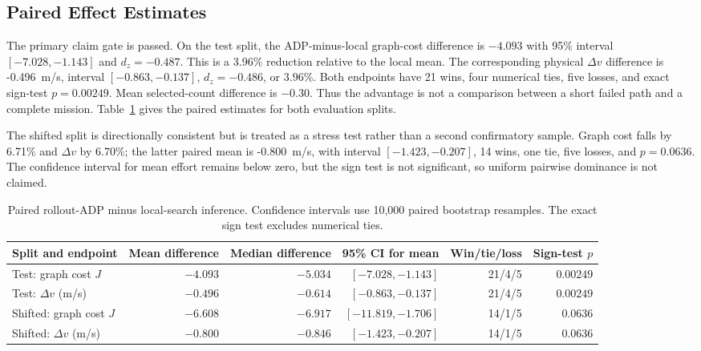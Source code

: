 \documentclass{IEEEtaes}
\newcommand{\unit}[2]{#1~#2}
\theoremstyle{remark}
\theoremstyle{plain}
\begin{document}
\subsection{Paired Effect Estimates}

The primary claim gate is passed. On the test split, the ADP-minus-local graph-cost difference is $-4.093$ with 95\% interval $[-7.028,-1.143]$ and $d_z=-0.487$. This is a 3.96\% reduction relative to the local mean. The corresponding physical $\Delta v$ difference is \unit{-0.496}{m/s}, interval $[-0.863,-0.137]$, $d_z=-0.486$, or 3.96\%. Both endpoints have 21 wins, four numerical ties, five losses, and exact sign-test $p=0.00249$. Mean selected-count difference is $-0.30$. Thus the advantage is not a comparison between a short failed path and a complete mission. Table~\ref{tab:paired-inference} gives the paired estimates for both evaluation splits.

The shifted split is directionally consistent but is treated as a stress test rather than a second confirmatory sample. Graph cost falls by 6.71\% and $\Delta v$ by 6.70\%; the latter paired mean is \unit{-0.800}{m/s}, with interval $[-1.423,-0.207]$, 14 wins, one tie, five losses, and $p=0.0636$. The confidence interval for mean effort remains below zero, but the sign test is not significant, so uniform pairwise dominance is not claimed.

\begin{table}[t]
  \centering
  \caption{Paired rollout-ADP minus local-search inference. Confidence intervals use 10,000 paired bootstrap resamples. The exact sign test excludes numerical ties.}
  \label{tab:paired-inference}
  \renewcommand{\arraystretch}{1.06}
  \setlength{\tabcolsep}{5pt}
  \footnotesize
  \begin{tabular}{@{}lrrrrr@{}}
    \toprule
    Split and endpoint & Mean difference & Median difference & 95\% CI for mean & Win/tie/loss & Sign-test $p$ \\
    \midrule
    Test: graph cost $J$ & $-4.093$ & $-5.034$ & $[-7.028,-1.143]$ & 21/4/5 & $0.00249$ \\
    Test: $\Delta v$ (m/s) & $-0.496$ & $-0.614$ & $[-0.863,-0.137]$ & 21/4/5 & $0.00249$ \\
    Shifted: graph cost $J$ & $-6.608$ & $-6.917$ & $[-11.819,-1.706]$ & 14/1/5 & $0.0636$ \\
    Shifted: $\Delta v$ (m/s) & $-0.800$ & $-0.846$ & $[-1.423,-0.207]$ & 14/1/5 & $0.0636$ \\
    \bottomrule
  \end{tabular}
\end{table}
\end{document}
